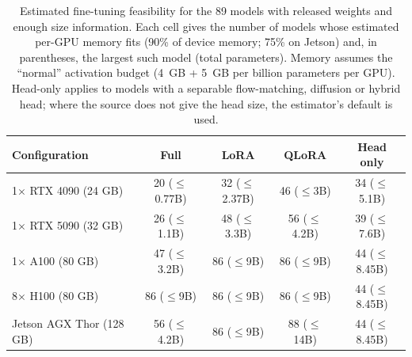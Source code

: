 \begin{table}[H]
\caption{Estimated fine-tuning feasibility for the 89 models with released weights and enough size information. Each cell gives the number of models whose estimated per-GPU memory fits (90\% of device memory; 75\% on Jetson) and, in parentheses, the largest such model (total parameters). Memory assumes the ``normal'' activation budget (4~GB + 5~GB per billion parameters per GPU). Head-only applies to models with a separable flow-matching, diffusion or hybrid head; where the source does not give the head size, the estimator's default is used.\label{tab:tune}}
\small
\begin{tabularx}{\textwidth}{@{}X c c c c@{}}
\toprule
\textbf{Configuration} & \textbf{Full} & \textbf{LoRA} & \textbf{QLoRA} & \textbf{Head only}\\
\midrule
1$\times$ RTX 4090 (24 GB) & 20 ($\le$0.77B) & 32 ($\le$2.37B) & 46 ($\le$3B) & 34 ($\le$5.1B)\\
1$\times$ RTX 5090 (32 GB) & 26 ($\le$1.1B) & 48 ($\le$3.3B) & 56 ($\le$4.2B) & 39 ($\le$7.6B)\\
1$\times$ A100 (80 GB) & 47 ($\le$3.2B) & 86 ($\le$9B) & 86 ($\le$9B) & 44 ($\le$8.45B)\\
8$\times$ H100 (80 GB) & 86 ($\le$9B) & 86 ($\le$9B) & 86 ($\le$9B) & 44 ($\le$8.45B)\\
Jetson AGX Thor (128 GB) & 56 ($\le$4.2B) & 86 ($\le$9B) & 88 ($\le$14B) & 44 ($\le$8.45B)\\
\bottomrule
\end{tabularx}
\end{table}
